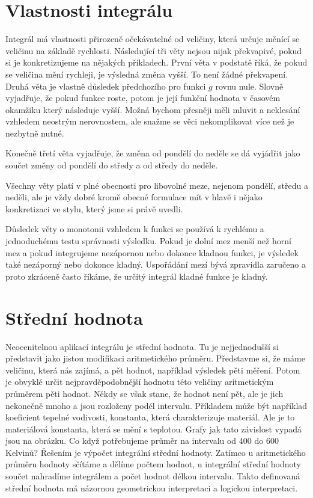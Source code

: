 \documentclass[12pt]{article}
\begin{document}
\section*{Vlastnosti integrálu}

Integrál má vlastnosti přirozeně očekávatelné od veličiny, která určuje měnící se veličinu na základě rychlosti. Následující tři věty nejsou nijak překvapivé, pokud si je konkretizujeme na nějakých příkladech. První věta v podstatě říká, že pokud se veličina mění rychleji, je výsledná změna vyšší. To není žádné překvapení. Druhá věta je vlastně důsledek předchozího pro funkci $g$ rovnu nule. Slovně vyjadřuje, že pokud funkce roste, potom je její funkční hodnota v časovém okamžiku který následuje vyšší. Možná bychom přesněji měli mluvit a neklesání vzhledem  neostrým nerovnostem, ale snažme se věci nekomplikovat více než je nezbytně nutné.

Konečně třetí věta vyjadřuje, že změna od pondělí do neděle se dá vyjádřit jako součet změny od pondělí do středy a od středy do neděle.

Všechny věty platí v plné obecnosti pro libovolné meze, nejenom pondělí, středu a neděli, ale je vždy dobré kromě obecné formulace mít v hlavě i nějako konkretizaci ve stylu, který jsme si právě uvedli.

Důsledek věty o monotonii vzhledem k funkci se používá k rychlému a jednoduchému testu správnosti výsledku. Pokud je dolní mez menší než horní mez a pokud integrujeme nezápornou nebo dokonce kladnou funkci, je výsledek také nezáporný nebo dokonce kladný. Uspořádání mezí bývá zpravidla zaručeno a proto zkráceně často říkáme, že určitý integrál kladné funkce je kladný. 

\section*{Střední hodnota}

Neocenitelnou aplikací integrálu je střední hodnota. Tu je nejjednodušší si představit jako jistou modifikaci aritmetického průměru. Představme si, že máme veličinu, která nás zajímá, a pět hodnot, například výsledek pěti měření. Potom je obvyklé určit nejpravděpodobnější hodnotu této veličiny aritmetickým průměrem pěti hodnot. Někdy se však stane, že hodnot není pět, ale je jich nekonečně mnoho a jsou rozloženy podél intervalu. Příkladem může být například koeficient tepelné vodivosti, konstanta, která charakterizuje materiál. Ale je to materiálová konstanta, která se mění s teplotou. Grafy jak tato závislost vypadá jsou na obrázku. Co když potřebujeme průměr na intervalu od 400 do 600 Kelvinů? Řešením je výpočet integrální střední hodnoty. Zatímco u aritmetického průměru hodnoty sčítáme a dělíme počtem hodnot, u integrální střední hodnoty součet nahradíme integrálem a počet hodnot délkou intervalu. Takto definovaná střední hodnota má názornou geometrickou interpretaci a logickou interpretaci.
\end{document}
